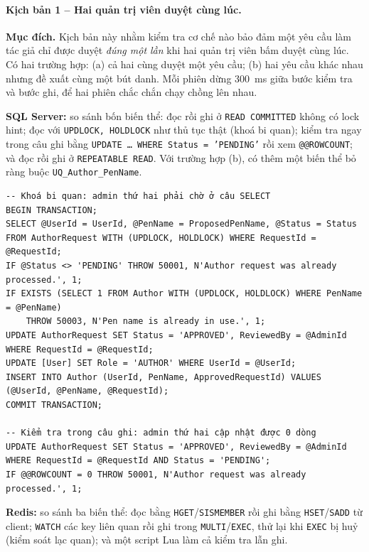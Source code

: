 \paragraph{Kịch bản 1 -- Hai quản trị viên duyệt cùng lúc.}

\textbf{Mục đích.} Kịch bản này nhằm kiểm tra cơ chế nào bảo đảm một yêu cầu làm tác giả chỉ được duyệt \emph{đúng một lần} khi hai quản trị viên bấm duyệt cùng lúc. Có hai trường hợp: (a) cả hai cùng duyệt một yêu cầu; (b) hai yêu cầu khác nhau nhưng đề xuất cùng một bút danh. Mỗi phiên dừng 300~ms giữa bước kiểm tra và bước ghi, để hai phiên chắc chắn chạy chồng lên nhau.

\textbf{SQL Server:} so sánh bốn biến thể: đọc rồi ghi ở \texttt{READ COMMITTED} không có lock hint; đọc với \texttt{UPDLOCK, HOLDLOCK} như thủ tục thật (khoá bi quan); kiểm tra ngay trong câu ghi bằng \texttt{UPDATE \ldots{} WHERE Status = 'PENDING'} rồi xem \texttt{@@ROWCOUNT}; và đọc rồi ghi ở \texttt{REPEATABLE READ}. Với trường hợp (b), có thêm một biến thể bỏ ràng buộc \texttt{UQ\_Author\_PenName}.

\begin{verbatim}
-- Khoá bi quan: admin thứ hai phải chờ ở câu SELECT
BEGIN TRANSACTION;
SELECT @UserId = UserId, @PenName = ProposedPenName, @Status = Status
FROM AuthorRequest WITH (UPDLOCK, HOLDLOCK) WHERE RequestId = @RequestId;
IF @Status <> 'PENDING' THROW 50001, N'Author request was already processed.', 1;
IF EXISTS (SELECT 1 FROM Author WITH (UPDLOCK, HOLDLOCK) WHERE PenName = @PenName)
    THROW 50003, N'Pen name is already in use.', 1;
UPDATE AuthorRequest SET Status = 'APPROVED', ReviewedBy = @AdminId WHERE RequestId = @RequestId;
UPDATE [User] SET Role = 'AUTHOR' WHERE UserId = @UserId;
INSERT INTO Author (UserId, PenName, ApprovedRequestId) VALUES (@UserId, @PenName, @RequestId);
COMMIT TRANSACTION;

-- Kiểm tra trong câu ghi: admin thứ hai cập nhật được 0 dòng
UPDATE AuthorRequest SET Status = 'APPROVED', ReviewedBy = @AdminId
WHERE RequestId = @RequestId AND Status = 'PENDING';
IF @@ROWCOUNT = 0 THROW 50001, N'Author request was already processed.', 1;
\end{verbatim}

\textbf{Redis:} so sánh ba biến thể: đọc bằng \texttt{HGET}/\texttt{SISMEMBER} rồi ghi bằng \texttt{HSET}/\texttt{SADD} từ client; \texttt{WATCH} các key liên quan rồi ghi trong \texttt{MULTI}/\texttt{EXEC}, thử lại khi \texttt{EXEC} bị huỷ (kiểm soát lạc quan); và một script Lua làm cả kiểm tra lẫn ghi.

